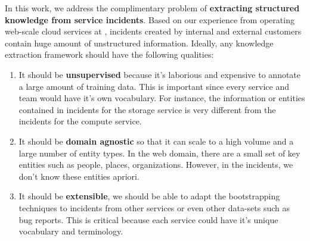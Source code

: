 In this work, we address the complimentary problem of \textbf{extracting structured knowledge from service incidents}. Based on our experience from operating web-scale cloud services at \CompanyX{}, incidents created by internal and external customers contain huge amount of unstructured information. Ideally, any knowledge extraction framework should have the following qualities:
\begin{enumerate}
    \item It should be \textbf{unsupervised} because it's laborious and expensive to annotate a large amount of training data. This is important since every service and team would have it's own vocabulary. For instance, the information or entities contained in incidents for the storage service is very different from the incidents for the compute service.
    \item It should be \textbf{domain agnostic} so that it can scale to a high volume and a large number of entity types. In the web domain, there are a small set of key entities such as people, places, organizations. However, in the incidents, we don't know these entities apriori.
    \item It should be \textbf{extensible}, we should be able to adapt the bootstrapping techniques to incidents from other services or even other data-sets such as bug reports. This is critical because each service could have it's unique vocabulary and terminology.
\end{enumerate}

